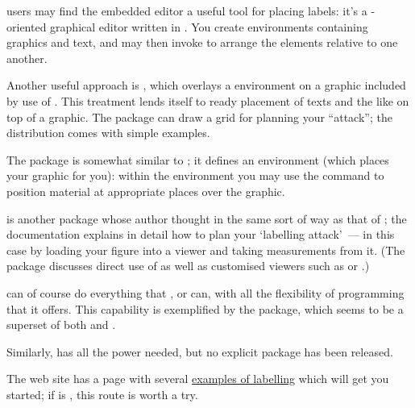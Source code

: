  users may find the embedded editor  a
useful tool for placing labels: it's a \AllTeX{}-oriented graphical
editor written in .  You create
 environments containing graphics and text, and
may then invoke  to arrange the elements relative to one
another.

Another useful approach is , which overlays a
 environment on a graphic included by use of
.  This treatment lends itself to ready placement
of texts and the like on top of a graphic.  The package can draw a
grid for planning your ``attack''; the distribution comes with simple
examples.

The  package is somewhat similar to ;
it defines an environment  (which places your
graphic for you): within the environment you may use the command
 to position \latex{} material at appropriate places over the
graphic.

 is another package whose author thought in the same
sort of way as that of ; the documentation explains
in detail how to plan your `labelling attack'~--- in this case by
loading your figure into a viewer and taking measurements from it.
(The package discusses direct use of
\href{http://www.ghostscript.com/}{} as well as
customised viewers such as
\href{http://www.ghostgum.com.au/}{} or
.)

 can of course do everything
that ,  or 
can, with all the flexibility of \PS{} programming that it offers.
This capability is exemplified by the  package,
which seems to be a superset of both  and
.

Similarly,  has all the power needed, but no
explicit package has been released.

The  web site has a page with several %
\href{http://pstricks.tug.org/main.cgi?file=Examples/overlay}{examples of labelling}
which will get you started; if  is %
, this route is worth a try.

